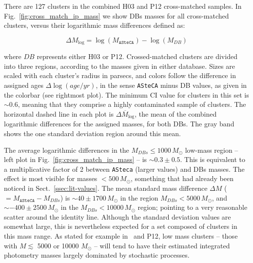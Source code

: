 \documentclass[draft]{aa}
\begin{document}
There are 127 clusters in the combined H03 and P12 cross-matched samples.
In Fig.~\ref{fig:cross_match_ip_mass} we show DBs masses for all cross-matched
clusters, versus their logarithmic mass differences defined as:

\begin{equation}
\Delta M_{\log} = \log(M_{\mathtt{ASteCA}}) - \log(M_{DB})
\label{eq:log_mass_diffs}
\end{equation}

\noindent where $DB$ represents either H03 or P12. Crossed-matched clusters are
divided into three regions, according to the masses given in either database.
%
Sizes are scaled with each cluster's radius in parsecs, and colors follow the
difference in assigned ages $\Delta \log(age/yr)$, in the sense \texttt{ASteCA}
minus DB values, as given in the colorbar (see rightmost plot).
The minimum CI value for clusters in this set is ${\sim}0.6$, meaning that they
comprise a highly contaminated sample of clusters.
The horizontal dashed line in each plot is $\overline{\Delta M_{\log}}$, the
mean of the combined logarithmic differences for the assigned masses, for both
DBs. The gray band shows the one standard deviation region around this mean.

The average logarithmic differences in the $M_{DBs}{\le}1000\,M_{\odot}$
low-mass region -- left plot in Fig.~\ref{fig:cross_match_ip_mass} -- is
${\sim}0.3\pm0.5$. This is equivalent to a multiplicative factor of 2 between
\texttt{ASteca} (larger values) and DBs masses. The effect is most visible for
masses ${<}500\,M_{\odot}$, something that had already been noticed in
Sect.~\ref{ssec:lit-values}.
%
The mean standard mass difference $\Delta M$ (${=}M_{\mathtt{ASteCA}}-M_{DBs}$)
is ${\sim}40{\pm}1700\,M_{\odot}$ in the region $M_{DBs} {<}5000\,M_{\odot}$,
and ${\sim-}400{\pm}2500\,M_{\odot}$ in the $M_{DBs} {<}10000\,M_{\odot}$
region; pointing to a very reasonable scatter around the identity line.
%
Although the standard deviation values are somewhat large, this is
nevertheless expected for a set composed of clusters in this mass range.
As stated for example in~\cite{Baumgardt_2013} and P12, low mass clusters
-- those with $M{\lesssim}$ 5000 or 10000 $M_{\odot}$ -- will tend to have
their estimated integrated photometry masses largely dominated by stochastic
processes.
\end{document}
